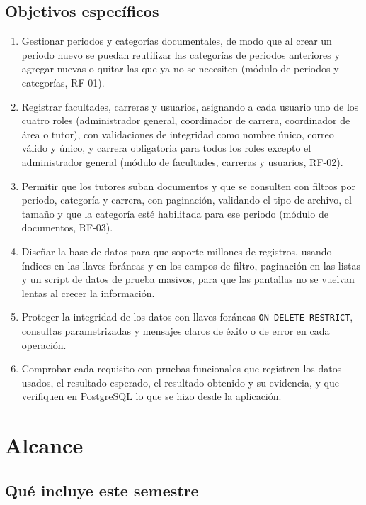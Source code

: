 \subsection{Objetivos específicos}

\begin{enumerate}[label=\textbf{OE\arabic*.}, leftmargin=1.6cm]
  \item Gestionar periodos y categorías documentales, de modo que al crear un periodo
        nuevo se puedan reutilizar las categorías de periodos anteriores y agregar
        nuevas o quitar las que ya no se necesiten (módulo de periodos y categorías,
        RF-01).
  \item Registrar facultades, carreras y usuarios, asignando a cada usuario uno de los
        cuatro roles (administrador general, coordinador de carrera, coordinador de área
        o tutor), con validaciones de integridad como nombre único, correo válido y
        único, y carrera obligatoria para todos los roles excepto el administrador
        general (módulo de facultades, carreras y usuarios, RF-02).
  \item Permitir que los tutores suban documentos y que se consulten con filtros por
        periodo, categoría y carrera, con paginación, validando el tipo de archivo, el
        tamaño y que la categoría esté habilitada para ese periodo (módulo de
        documentos, RF-03).
  \item Diseñar la base de datos para que soporte millones de registros, usando índices
        en las llaves foráneas y en los campos de filtro, paginación en las listas y un
        script de datos de prueba masivos, para que las pantallas no se vuelvan lentas
        al crecer la información.
  \item Proteger la integridad de los datos con llaves foráneas \texttt{ON DELETE
        RESTRICT}, consultas parametrizadas y mensajes claros de éxito o de error en
        cada operación.
  \item Comprobar cada requisito con pruebas funcionales que registren los datos
        usados, el resultado esperado, el resultado obtenido y su evidencia, y que
        verifiquen en PostgreSQL lo que se hizo desde la aplicación.
\end{enumerate}

\section{Alcance}

\subsection{Qué incluye este semestre}

